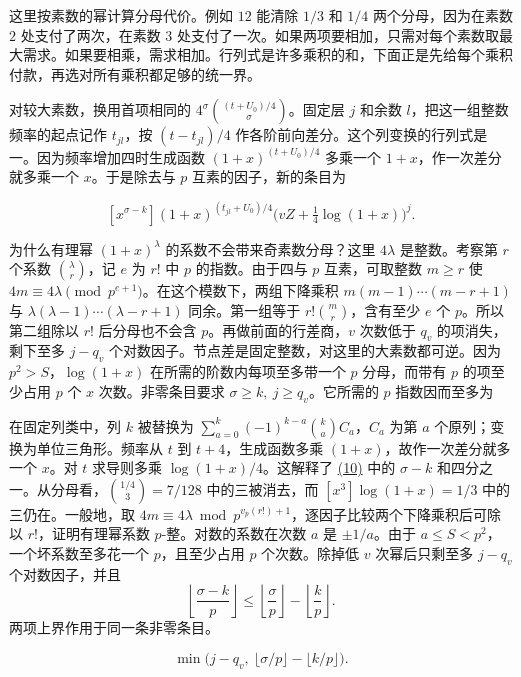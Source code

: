 \documentclass[11pt,a4paper]{article}
\begin{document}
这里按素数的幂计算分母代价。例如 \(12\) 能清除 \(1/3\) 和 \(1/4\) 两个分母，因为在素数 \(2\) 处支付了两次，在素数 \(3\) 处支付了一次。如果两项要相加，只需对每个素数取最大需求。如果要相乘，需求相加。行列式是许多乘积的和，下面正是先给每个乘积付款，再选对所有乘积都足够的统一界。

对较大素数，换用首项相同的 \(4^\sigma\binom{(t+U_0)/4}{\sigma}\)。固定层 \(j\) 和余数 \(l\)，把这一组整数频率的起点记作 \(t_{jl}\)，按 \((t-t_{jl})/4\) 作各阶前向差分。这个列变换的行列式是一。因为频率增加四时生成函数 \((1+x)^{(t+U_0)/4}\) 多乘一个 \(1+x\)，作一次差分就多乘一个 \(x\)。于是除去与 \(p\) 互素的因子，新的条目为

\[
 [x^{\sigma-k}](1+x)^{(t_{jl}+U_0)/4}
        \big(vZ+\tfrac14\log(1+x)\big)^j .                               \tag{10}\label{eq:10}
\]

为什么有理幂 \((1+x)^\lambda\) 的系数不会带来奇素数分母？这里 \(4\lambda\) 是整数。考察第 \(r\) 个系数 \(\binom{\lambda}{r}\)，记 \(e\) 为 \(r!\) 中 \(p\) 的指数。由于四与 \(p\) 互素，可取整数 \(m\ge r\) 使 \(4m\equiv4\lambda\pmod{p^{e+1}}\)。在这个模数下，两组下降乘积 \(m(m-1)\cdots(m-r+1)\) 与 \(\lambda(\lambda-1)\cdots(\lambda-r+1)\) 同余。第一组等于 \(r!\binom mr\)，含有至少 \(e\) 个 \(p\)。所以第二组除以 \(r!\) 后分母也不会含 \(p\)。再做前面的行差商，\(v\) 次数低于 \(q_v\) 的项消失，剩下至多 \(j-q_v\) 个对数因子。节点差是固定整数，对这里的大素数都可逆。因为 \(p^2>S\)，\(\log(1+x)\) 在所需的阶数内每项至多带一个 \(p\) 分母，而带有 \(p\) 的项至少占用 \(p\) 个 \(x\) 次数。非零条目要求 \(\sigma\ge k,\ j\ge q_v\)。它所需的 \(p\) 指数因而至多为

在固定列类中，列 \(k\) 被替换为 \(\sum_{a=0}^k(-1)^{k-a}\binom ka C_a\)，\(C_a\) 为第 \(a\) 个原列；变换为单位三角形。频率从 \(t\) 到 \(t+4\)，生成函数多乘 \((1+x)\)，故作一次差分就多一个 \(x\)。对 \(t\) 求导则多乘 \(\log(1+x)/4\)。这解释了 \hyperref[eq:10]{(10)} 中的 \(\sigma-k\) 和四分之一。从分母看，\(\binom{1/4}{3}=7/128\) 中的三被消去，而 \([x^3]\log(1+x)=1/3\) 中的三仍在。一般地，取 \(4m\equiv4\lambda\bmod p^{v_p(r!)+1}\)，逐因子比较两个下降乘积后可除以 \(r!\)，证明有理幂系数 \(p\)-整。对数的系数在次数 \(a\) 是 \(\pm1/a\)。由于 \(a\le S<p^2\)，一个坏系数至多花一个 \(p\)，且至少占用 \(p\) 个次数。除掉低 \(v\) 次幂后只剩至多 \(j-q_v\) 个对数因子，并且 \[
 \left\lfloor\frac{\sigma-k}{p}\right\rfloor
 \le \left\lfloor\frac{\sigma}{p}\right\rfloor-\left\lfloor\frac{k}{p}\right\rfloor .
\] 两项上界作用于同一条非零条目。

\[
 \min\big(j-q_v,\ \lfloor\sigma/p\rfloor-\lfloor k/p\rfloor\big).
\]
\end{document}

